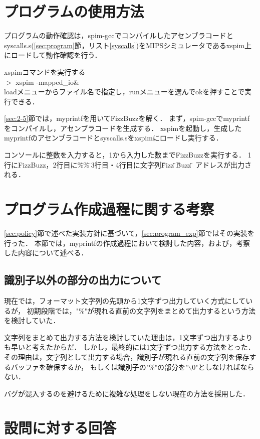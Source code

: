 \documentclass[11pt]{jarticle}
\begin{document}
\section{プログラムの使用方法}

プログラムの動作確認は，spim-gccでコンパイルしたアセンブラコードと
syscalls.s(\ref{sec:program}節，リスト\ref{syscalls})をMIPSシミュレータであるxspim上にロードして動作確認を行う．

xspimコマンドを実行する\\
$>$ xspim -mapped\_io\&\\

loadメニューからファイル名で指定し，runメニューを選んでokを押すことで実行できる．

\ref{sec:2-5}節では，myprintfを用いてFizzBuzzを解く．
まず，spim-gccでmyprintfをコンパイルし，アセンブラコードを生成する．
xspimを起動し，生成したmyprintfのアセンブラコードとsyscalls.sをxspimにロードし実行する．

コンソールに整数を入力すると，1から入力した数までFizzBuzzを実行する．
1行にFizzBuzz，2行目に\"\%\%\"，3行目・4行目に文字列\"Fizz\"・\"Buzz\"の
アドレスが出力される．

\section{プログラム作成過程に関する考察}

\ref{sec:policy}節で述べた実装方針に基づいて，\ref{sec:program_exp}節ではその実装を行った．
本節では，myprintfの作成過程において検討した内容，および，考察した内容について述べる．

\subsection{識別子以外の部分の出力について}

現在では，フォーマット文字列の先頭から1文字ずつ出力していく方式にしているが，
初期段階では，"\%"が現れる直前の文字列をまとめて出力するという方法を検討していた．

文字列をまとめて出力する方法を検討していた理由は，1文字ずつ出力するよりも早いと考えたからだ．
しかし，最終的には1文字ずつ出力する方法をとった．
その理由は，文字列として出力する場合，識別子が現れる直前の文字列を保存するバッファを確保するか，
もしくは識別子の"\%"の部分を"$\backslash$0"としなければならない．

バグが混入するのを避けるために複雑な処理をしない現在の方法を採用した．

\section{設問に対する回答}
\end{document}
